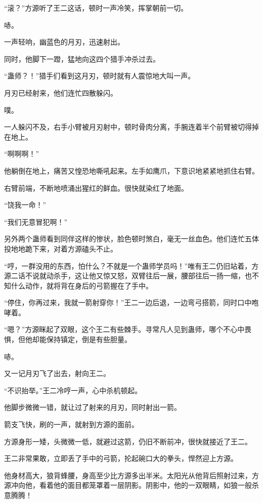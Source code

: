 
\begin{this_body}



“滚？”方源听了王二这话，顿时一声冷笑，挥掌朝前一切。

哧。

一声轻响，幽蓝色的月刃，迅速射出。

同时，他脚下一蹬，猛地向这四个猎手冲杀过去。

“蛊师？！”猎手们看到这月刃，顿时就有人震惊地大叫一声。

月刃已经射来，他们连忙四散躲闪。

噗。

一人躲闪不及，右手小臂被月刃射中，顿时骨肉分离，手腕连着半个前臂被切得掉在地上。

“啊啊啊！”

他躺倒在地上，痛苦又惶恐地嘶吼起来。左手如鹰爪，下意识地紧紧地抓住右臂。

右臂前端，不断地喷涌出猩红的鲜血。很快就染红了地面。

“饶我一命！”

“我们无意冒犯啊！”

另外两个蛊师看到同伴这样的惨状，脸色顿时煞白，毫无一丝血色。他们连忙五体投地地跪下来，对着方源磕头不止。

“哼，一群没用的东西，怕什么？不就是一个蛊师学员吗！”唯有王二仍旧站着，方源二话不说就动杀手，这让他又惊又怒，双臂往后一展，腰部往后一扬一缩，也不知什么动作，就将背在身后的弓箭握在了手中。

“停住，你再过来，我就一箭射穿你！”王二一边后退，一边弯弓搭箭，同时口中咆哮着。

“嗯？”方源眯起了双眼，这个王二有些棘手。寻常凡人见到蛊师，哪个不心中畏惧，但他却能保持镇定，倒是有些胆量。

哧。

又一记月刃飞了出去，射向王二。

“不识抬举。”王二冷哼一声，心中杀机顿起。

他脚步微微一错，就让过了射来的月刃，同时射出一箭。

箭支飞快，刷的一声，就射到方源的面前。

方源身形一矮，头微微一低，就避过这箭，仍旧不断前冲，很快就接近了王二。

王二非常果敢，立即丢了手中的弓箭，抡起碗口大的拳头，悍然迎上方源。

他身材高大，狼背蜂腰，身高至少比方源多出半米。太阳光从他背后照射过来，方源冲向他，看着他的面目都笼罩着一层阴影。阴影中，他的一双眼睛，如狼一般杀意腾腾！


\end{this_body}
